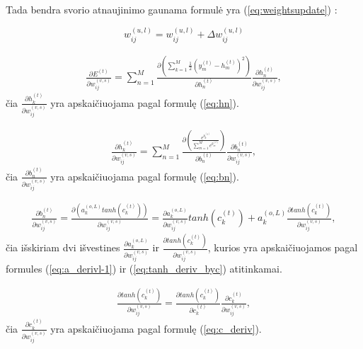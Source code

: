Tada bendra svorio atnaujinimo gaunama formulė yra (\ref{eq:weightsupdate}) :

\begin{equation}\label{eq:weightsupdate}
  w_{ij}^{(u,l)} = w_{ij}^{(u,l)} + \Delta w_{ij}^{(u,l)}
\end{equation}

\begin{equation} \label{eq:E_deriv}
  \begin{aligned}
  \frac{\partial E^{(t)}}{\partial w_{ij}^{(v,s)}} = \sum_{n=1}^{M} \frac{\partial (\sum_{k=1}^{M} \frac{1}{2}(y_m^{(t)} - h_m^{(t)})^{2})}{\partial h_n^{(t)}} \frac{\partial h_n^{(t)}}{\partial w_{ij}^{(v,s)}},
  \end{aligned}
\end{equation}
čia $\frac{\partial h_k^{(t)}}{\partial w_{ij}^{(v,s)}}$ yra apskaičiuojama pagal formulę (\ref{eq:hn}).


\begin{equation} \label{eq:hn}
  \begin{aligned}
  \frac{\partial h_k^{(t)}}{\partial w_{ij}^{(v,s)}}
  =
  \sum_{n=1}^{M}
  \frac{\partial (\frac{e^{b_k^{(t)}}}{\sum_{m=1}^{M} e^{b_m^{(t)}}})}
  {\partial b_n^{(t)}}
   \frac{\partial b_n^{(t)}}{\partial w_{ij}^{(v,s)}},
   \end{aligned}
\end{equation}
čia $\frac{\partial b_n^{(t)}}{\partial w_{ij}^{(v,s)}}$ yra apskaičiuojama pagal formulę (\ref{eq:bn}).




\begin{equation} \label{eq:bn}
  \begin{aligned}
  \frac{\partial b_n^{(t)}}{\partial w_{ij}^{(v,s)}}
  =
  \frac{\partial (a_k^{(o,L)} tanh(c_k^{(t)}))}{\partial w_{ij}^{(v,s)}}
  =
  \frac{\partial a_k^{(o,L)}}{\partial w_{ij}^{(v,s)}} tanh(c_k^{(t)}) +
  a_k^{(o,L)} \frac{\partial tanh(c_k^{(t)})}{\partial w_{ij}^{(v,s)}},
  \end{aligned}
\end{equation}
čia išskiriam dvi išvestines $\frac{\partial a_k^{(o,L)}}{\partial w_{ij}^{(v,s)}}$ ir $\frac{\partial tanh(c_k^{(t)})}{\partial w_{ij}^{(v,s)}}$, kurios yra apskaičiuojamos pagal formules (\ref{eq:a_derivl-1}) ir (\ref{eq:tanh_deriv_byc}) atitinkamai.


\begin{equation} \label{eq:tanh_deriv_byc}
  \begin{aligned}
  \frac{\partial tanh(c_k^{(t)})}{\partial w_{ij}^{(v,s)}} =
  \frac{\partial tanh(c_k^{(t)})}{\partial c_k^{(t)}}
  \frac{\partial c_k^{(t)}}{\partial w_{ij}^{(v,s)}},
  \end{aligned}
\end{equation}
čia $\frac{\partial c_k^{(t)}}{\partial w_{ij}^{(v,s)}}$ yra apskaičiuojama pagal formulę (\ref{eq:c_deriv}).


